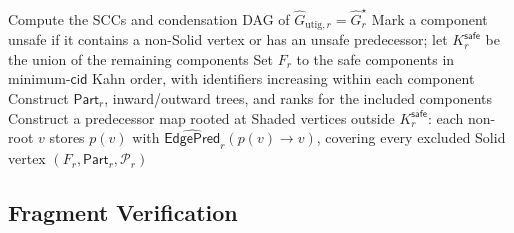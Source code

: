 \begin{algorithm}[h!]
\caption{\textsc{SafeExtract}: Expanded Safe Extraction}
\label{alg:safe-extract}
\footnotesize
{}
Compute the SCCs and condensation DAG of
$\widehat G_{\mathrm{utig},r}=\widehat G_r^\star$\;
Mark a component unsafe if it contains a non-Solid vertex or has an unsafe
predecessor; let $K_r^{\mathsf{safe}}$ be the union of the remaining components\;
Set $F_r$ to the safe components in minimum-$\mathsf{cid}$ Kahn order, with
identifiers increasing within each component\;
Construct $\mathsf{Part}_r$, inward/outward trees, and ranks for the included
components\;
Construct a predecessor map rooted at Shaded vertices outside
$K_r^{\mathsf{safe}}$: each non-root $v$ stores $p(v)$ with
$\widehat{\mathsf{EdgePred}}_r(p(v)\to v)$, covering every excluded Solid vertex\;
\KwRet $(F_r,\mathsf{Part}_r,\mathcal P_r)$
\end{algorithm}

\subsection{Fragment Verification}

